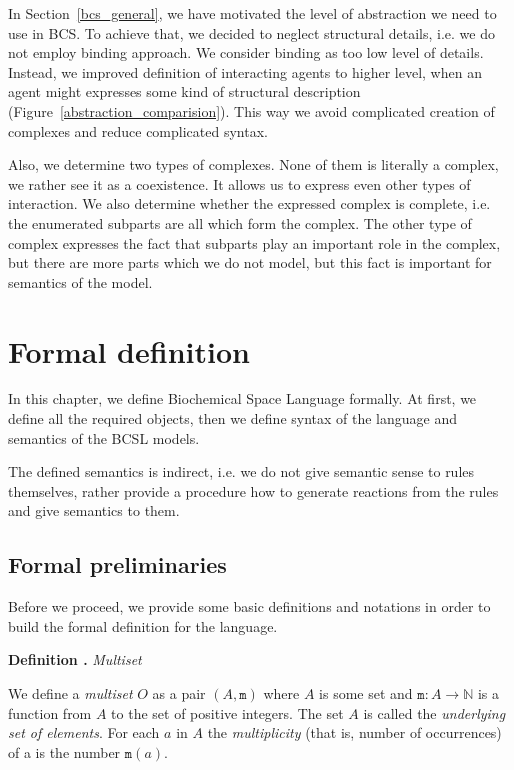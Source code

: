 \documentclass[12pt, twoside]{fithesis2} %
\newcounter{counter}[section]
\renewcommand{\thecounter}{\thesection.\arabic{counter}}
\newenvironment{definition}[1]{\bigskip\refstepcounter{counter}\noindent\textbf{Definition \thecounter } \emph{#1} \par\nopagebreak \begin{itshape}}{\end{itshape}\bigskip}
\begin{document}
In Section~\ref{bcs_general}, we have motivated the level of abstraction we need to use in BCS. To achieve that, we decided to neglect structural details, i.e. we do not employ binding approach. We consider binding as too low level of details. Instead, we improved definition of interacting agents to higher level, when an agent might expresses some kind of structural description (Figure~\ref{abstraction_comparision}). This way we avoid complicated creation of complexes and reduce complicated syntax.

Also, we determine two types of complexes. None of them is literally a complex, we rather see it as a coexistence. It allows us to express even other types of interaction. We also determine whether the expressed complex is complete, i.e. the enumerated subparts are all which form the complex. The other type of complex expresses the fact that subparts play an important role in the complex, but there are more parts which we do not model, but this fact is important for semantics of the model.

\chapter{Formal definition}
\label{formal_definition}

In this chapter, we define Biochemical Space Language formally. At first, we define all the required objects, then we define syntax of the language and semantics of the BCSL models.

The defined semantics is indirect, i.e. we do not give semantic sense to rules themselves, rather provide a procedure how to generate reactions from the rules and give semantics to them.

\section{Formal preliminaries}

Before we proceed, we provide some basic definitions and notations in order to build the formal definition for the language.

\begin{definition}{Multiset}
We define a \emph{multiset} $O$ as a pair $(A, \mathtt{m})$ where $A$ is some set and $ \mathtt{m} : A \rightarrow \mathbb{N} $ is a function from $A$ to the set of positive integers. The set $A$ is called the \emph{underlying set of elements}. For each $a$ in $A$ the \emph{multiplicity} (that is, number of occurrences) of a is the number $\mathtt{m}(a)$.
\end{definition}
\end{document}
